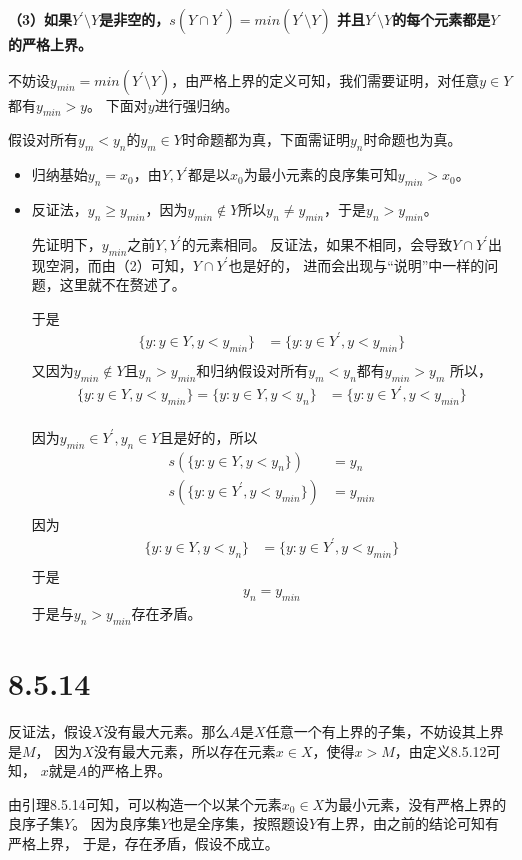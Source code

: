 \documentclass{article}
\begin{document}
\textbf{（3）如果$Y^\prime \setminus Y$是非空的，$s(Y \cap Y^\prime) = min(Y^\prime \setminus Y )$
  并且$Y^\prime \setminus Y$的每个元素都是$Y$的严格上界。}

不妨设$y_{min}=min(Y^\prime \setminus Y)$，由严格上界的定义可知，我们需要证明，对任意$y \in Y$都有$y_{min} > y$。
下面对$y$进行强归纳。

假设对所有$y_m < y_n$的$y_m \in Y$时命题都为真，下面需证明$y_n$时命题也为真。

\begin{itemize}
  \item 归纳基始$y_n = x_0$，由$Y,Y^\prime$都是以$x_0$为最小元素的良序集可知$y_{min} > x_0$。
  \item  反证法，$y_n \geq y_{min}$，因为$y_{min} \not \in Y$所以$y_n \neq y_{min}$，于是$y_n > y_{min}$。

        先证明下，$y_{min}$之前$Y, Y^\prime$的元素相同。
        反证法，如果不相同，会导致$Y \cap Y^\prime$出现空洞，而由（2）可知，$Y \cap Y^\prime$也是好的，
        进而会出现与“说明”中一样的问题，这里就不在赘述了。

        于是
        \begin{align*}
          \{ y : y \in Y, y < y_{min}\} & = \{ y : y \in Y^\prime, y < y_{min} \} \\
        \end{align*}
        又因为$y_{min} \not \in Y$且$y_n > y_{min}$和归纳假设对所有$y_m < y_n$都有$y_{min} > y_m $
        所以，
        \begin{align*}
          \{ y : y \in Y, y < y_{min}\} = \{ y : y \in Y, y < y_{n}\} & = \{ y : y \in Y^\prime, y < y_{min} \} \\
        \end{align*}

        因为$y_{min} \in Y^\prime, y_n \in Y$且是好的，所以
        \begin{align*}
          s(\{ y : y \in Y, y < y_n\})            & = y_n     \\
          s(\{ y : y \in Y^\prime, y < y_{min}\}) & = y_{min} \\
        \end{align*}
        因为
        \begin{align*}
          \{ y : y \in Y, y < y_{n}\} & = \{ y : y \in Y^\prime, y < y_{min} \} \\
        \end{align*}
        于是
        \begin{align*}
          y_n = y_{min}
        \end{align*}
        于是与$y_n > y_{min}$存在矛盾。
\end{itemize}

\section*{8.5.14}

反证法，假设$X$没有最大元素。那么$A$是$X$任意一个有上界的子集，不妨设其上界是$M$，
因为$X$没有最大元素，所以存在元素$x \in X$，使得$x > M$，由定义8.5.12可知，
$x$就是$A$的严格上界。

由引理8.5.14可知，可以构造一个以某个元素$x_0 \in X$为最小元素，没有严格上界的良序子集$Y$。
因为良序集$Y$也是全序集，按照题设$Y$有上界，由之前的结论可知有严格上界，
于是，存在矛盾，假设不成立。
\end{document}
